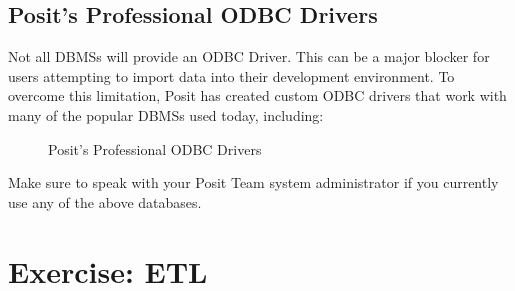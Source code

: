 \documentclass[
  letterpaper,
  DIV=11,
  numbers=noendperiod]{scrreprt}
\begin{document}
\section{Posit's Professional ODBC
Drivers}\label{posits-professional-odbc-drivers}

Not all DBMSs will provide an ODBC Driver. This can be a major blocker
for users attempting to import data into their development environment.
To overcome this limitation, Posit has created custom ODBC drivers that
work with many of the popular DBMSs used today, including:

\begin{figure}


\caption{\label{fig-posit-odbc-drivers}Posit's Professional ODBC
Drivers}

\end{figure}%

Make sure to speak with your Posit Team system administrator if you
currently use any of the above databases.

\chapter{Exercise: ETL}\label{sec-etl-background}
\end{document}
